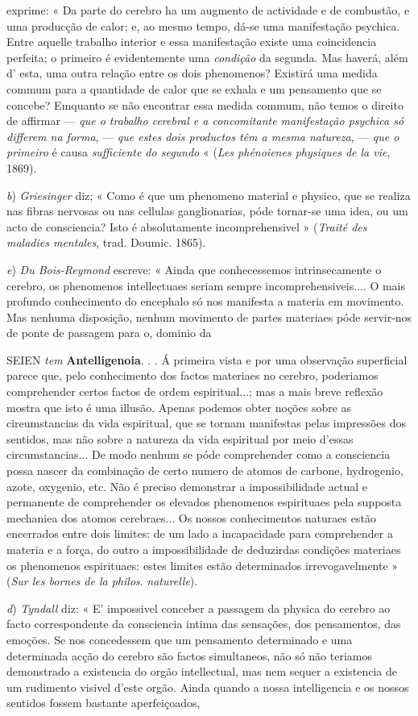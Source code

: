 exprime: « Da parte do cerebro ha um augmento de actividade e de combustão, e uma producção de calor; e, ao mesmo tempo, dá-se uma manifestação psychica. Entre aquelle trabalho interior e essa manifestação existe uma coincidencia perfeita; o primeiro é evidentemente uma \emph{condição} da segunda. Mas haverá, além d' esta, uma outra relação entre os dois phenomenos? Existirá uma medida commum para a quantidade de calor que se exhala e um pensamento que se concebe? Emquanto se não encontrar essa medida commum, não temos o direito de affirmar --- \emph{que o trabalho cerebral e a concomitante manifestação psychica só differem na forma}, --- \emph{que estes dois productos têm a mesma natureza}, --- \emph{que o primeiro} é causa \emph{sufficiente do segundo} « (\emph{Les phénoienes physiques de la vie}, 1869).\par \emph{b}) \emph{Griesinger} diz; « Como é que um phenomeno material e physico, que se realiza nas fibras nervosas ou nas cellulas ganglionarias, póde tornar-se uma idea, ou um acto de consciencia? Isto é absolutamente incomprehensivel » (\emph{Traité des maladies mentales}, trad. Doumic. 1865).\par \emph{e}) \emph{Du Bois-Reymond} escreve: « Ainda que conhecessemos intrinsecamente o cerebro, os phenomenos intellectuaes seriam sempre incomprehensiveis.... O mais profundo conhecimento do encephalo só nos manifesta a materia em movimento. Mas nenhuma disposição, nenhum movimento de partes materiaes póde servir-nos de ponte de passagem para o, dominio da\par SEIEN \emph{tem} \textbf{Antelligenoia}. . . Á primeira vista e por uma observação superficial parece que, pelo conhecimento dos factos materiaes no cerebro, poderiamos comprehender certos factos de ordem espiritual...; mas a mais breve reflexão mostra que isto é uma illusão. Apenas podemos obter noções sobre as cireumstancias da vida espiritual, que se tornam manifestas pelas impressões dos sentidos, mas não sobre a natureza da vida espiritual por meio d'essas circumstancias... De modo nenhum se póde comprehender como a consciencia possa nascer da combinação de certo numero de atomos de carbone, hydrogenio, azote, oxygenio, etc. Não é preciso demonstrar a impossibilidade actual e permanente de comprehender os elevados phenomenos espirituaes pela supposta mechaniea dos atomos cerebraes... Os nossos conhecimentos naturaes estão encerrados entre dois limites: de um lado a incapacidade para comprehender a materia e a força, do outro a impossibilidade de deduzirdas condições materiaes os phenomenos espirituaes: estes limites estão determinados irrevogavelmente » (\emph{Sur les bornes de la philos}. \emph{naturelle}).\par \emph{d}) \emph{Tyndall} diz: « E' impossivel conceber a passagem da physica do cerebro ao facto correspondente da consciencia intima das sensações, dos pensamentos, das emoções. Se nos concedessem que um pensamento determinado e uma determinada acção do cerebro são factos simultaneos, não só não teriamos demonstrado a existencia do orgão intellectual, mas nem sequer a existencia de um rudimento visivel d'este orgão. Ainda quando a nossa intelligencia e os nossos sentidos fossem bastante aperfeiçoados, 